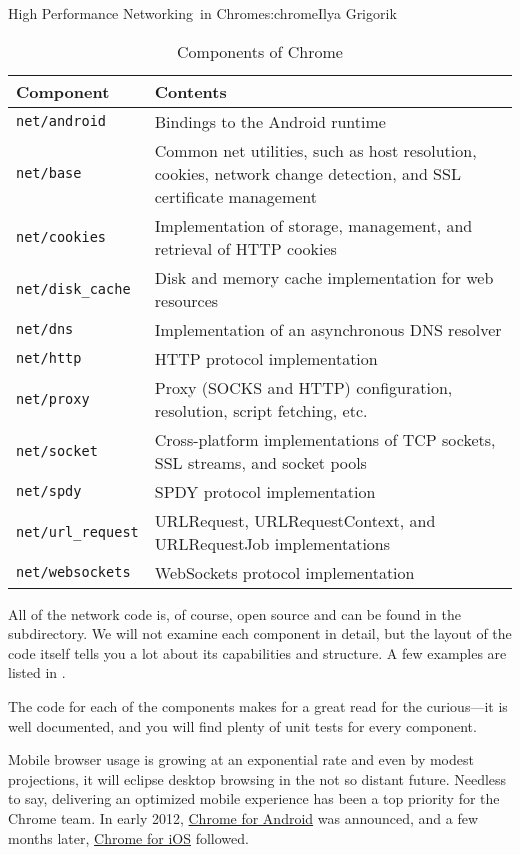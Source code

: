\begin{aosachapter}{High Performance Networking~in Chrome}{s:chrome}{Ilya Grigorik}
\begin{table}[h!]
\centering
{\footnotesize
{}
\begin{tabular}{p{2.6cm} p{5.0cm}}
\hline
\textbf{Component}
& \textbf{Contents}
\\
\hline
\texttt{net/android}
& Bindings to the Android runtime
\\
\texttt{net/base}
& Common net utilities, such as host resolution, cookies, network change detection, and SSL certificate management
\\
\texttt{net/cookies}
& Implementation of storage, management, and retrieval of HTTP cookies
\\
\texttt{net/disk\_cache}
& Disk and memory cache implementation for web resources
\\
\texttt{net/dns}
& Implementation of an asynchronous DNS resolver
\\
\texttt{net/http}
& HTTP protocol implementation
\\
\texttt{net/proxy}
& Proxy (SOCKS and HTTP) configuration, resolution, script fetching, etc.
\\
\texttt{net/socket}
& Cross-platform implementations of TCP sockets, SSL streams, and socket pools
\\
\texttt{net/spdy}
& SPDY protocol implementation
\\
\texttt{net/url\_request}
& URLRequest, URLRequestContext, and URLRequestJob implementations
\\
\texttt{net/websockets}
& WebSockets protocol implementation
\\
\hline
\end{tabular}
}

\caption{Components of Chrome}
\label{posa.chrome.components}
\end{table}

All of the network code is, of course, open source and can be found in
the  subdirectory. We will not examine each component in
detail, but the layout of the code itself tells you a lot about its
capabilities and structure. A few examples are listed in
.

The code for each of the components makes for a great read for the curious---it is
well documented, and you will find plenty of unit tests for every
component.


Mobile browser usage is growing at an exponential rate and even by
modest projections, it will eclipse desktop browsing in the not so
distant future. Needless to say, delivering an optimized mobile
experience has been a top priority for the Chrome team. In early 2012,
\href{http://www.google.com/intl/en/chrome/browser/mobile/android.html}{Chrome
for Android} was announced, and a few months later,
\href{http://www.google.com/intl/en/chrome/browser/mobile/ios.html}{Chrome
for iOS} followed.


\end{aosachapter}
